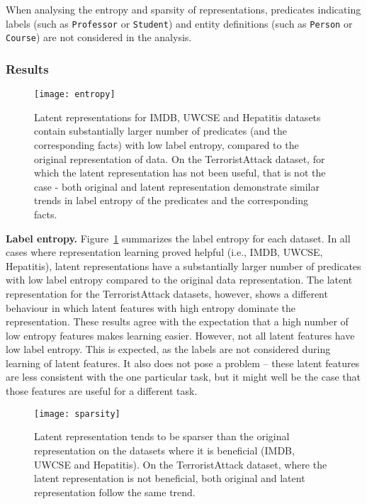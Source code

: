When analysing the entropy and sparsity of representations, predicates indicating labels (such as \texttt{Professor} or \texttt{Student}) and entity definitions (such as \texttt{Person} or \texttt{Course}) are not considered in the analysis.


\subsubsection{Results}


\begin{figure}[t]
	\centering
	\medskip
    \texttt{[image: entropy]}
    \caption{Latent representations for IMDB, UWCSE and Hepatitis datasets contain substantially larger number of predicates (and the corresponding facts) with low label entropy, compared to the original representation of data. On the TerroristAttack dataset, for which the latent representation has not been useful, that is not the case - both original and latent representation demonstrate similar trends in label entropy of the predicates and the corresponding facts.}
    \label{fig:Entropy}
\end{figure}


\textbf{Label entropy.}
Figure~\ref{fig:Entropy} summarizes the label entropy for each dataset.
In all cases where representation learning proved helpful (i.e., IMDB, UWCSE, Hepatitis), latent representations have a substantially larger number of predicates with low label entropy compared to the original data representation. 
The latent representation for the TerroristAttack datasets, however, shows a different behaviour in which latent features with high entropy dominate the representation.
These results agree with the expectation that a high number of low entropy features makes learning easier.
However, not all latent features have low label entropy.
This is expected, as the labels are not considered during learning of latent features.
It also does not pose a problem -- these latent features are less consistent with the one particular task, but it might well be the case that those features are useful for a different task.




\begin{figure}
	\centering
	\medskip
    \texttt{[image: sparsity]}
    \caption{Latent representation tends to be sparser than the original representation on the datasets where it is beneficial (IMDB, UWCSE and Hepatitis). On the TerroristAttack dataset, where the latent representation is not beneficial, both original and latent representation follow the same trend. }
    \label{fig:Sparsity}
\end{figure}


